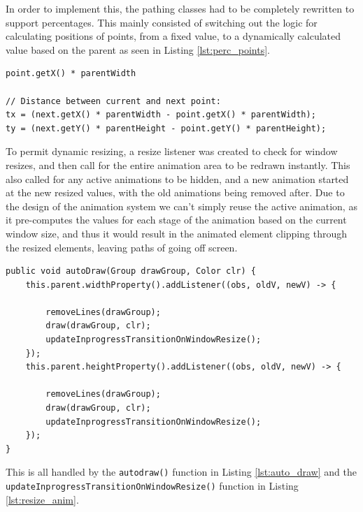 In order to implement this, the pathing classes had to be completely rewritten to support percentages. This mainly consisted of switching out the logic for calculating positions of points, from a fixed value, to a dynamically calculated value based on the parent as seen in Listing \ref{lst:perc_points}.
\begin{lstlisting}[caption=Percentage point caculations, label=lst:perc_points]
point.getX() * parentWidth

// Distance between current and next point:
tx = (next.getX() * parentWidth - point.getX() * parentWidth);
ty = (next.getY() * parentHeight - point.getY() * parentHeight);
\end{lstlisting}

To permit dynamic resizing, a resize listener was created to check for window resizes, and then call for the entire animation area to be redrawn instantly. This also called for any active animations to be hidden, and a new animation started at the new resized values, with the old animations being removed after. Due to the design of the animation system we can't simply reuse the active animation, as it pre-computes the values for each stage of the animation based on the current window size, and thus it would result in the animated element clipping through the resized elements, leaving paths of going off screen.

\begin{lstlisting}[caption=Auto draw function, label=lst:auto_draw]
public void autoDraw(Group drawGroup, Color clr) {
    this.parent.widthProperty().addListener((obs, oldV, newV) -> {

        removeLines(drawGroup);
        draw(drawGroup, clr);
        updateInprogressTransitionOnWindowResize();
    });
    this.parent.heightProperty().addListener((obs, oldV, newV) -> {

        removeLines(drawGroup);
        draw(drawGroup, clr);
        updateInprogressTransitionOnWindowResize();
    });
}
\end{lstlisting}

This is all handled by the \verb|autodraw()| function in Listing \ref{lst:auto_draw} and the \\ \verb|updateInprogressTransitionOnWindowResize()| function in Listing \ref{lst:resize_anim}.

